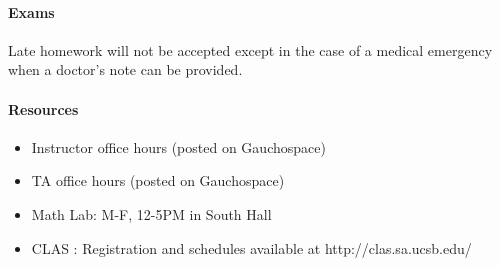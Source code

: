 \documentclass[a4paper,12pt]{article}
\begin{document}
 \paragraph{Exams} 
 Late homework will not be accepted except in the case of a medical emergency when a doctor's note can be provided. 




\paragraph{Resources}
\begin{itemize}
\item Instructor office hours (posted on Gauchospace)
\item TA office hours (posted on Gauchospace)
\item Math Lab: M-F, 12-5PM in South Hall
\item CLAS : Registration and schedules available at http://clas.sa.ucsb.edu/
\end{itemize} 
\end{document}
